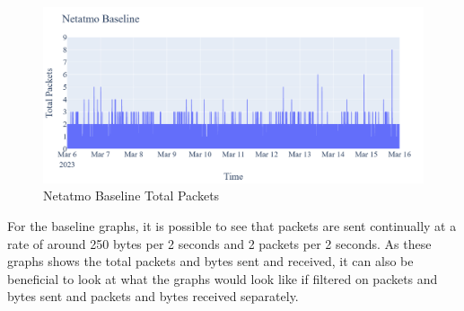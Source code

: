 \begin{figure} [H]         
    \includegraphics[scale=0.3]{figures/Netatmo_Baseline_TotalPackets.png}
    \caption{Netatmo Baseline Total Packets}
    \label{fig:NetatmoBaselineTotalPackets}
 \end{figure}

For the baseline graphs, it is possible to see that packets are sent continually at a rate of around 250 bytes per 2 seconds and 2 packets per 2 seconds. As these graphs shows the total packets and bytes sent and received, it can also be beneficial to look at what the graphs would look like if filtered on packets and bytes sent and packets and bytes received separately. 


